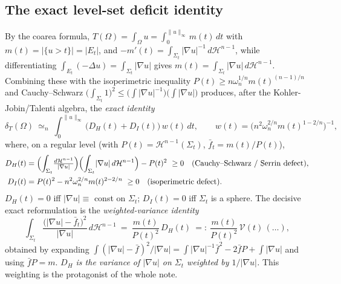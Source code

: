 \documentclass[11pt]{amsart}
\theoremstyle{definition}
\theoremstyle{remark}
\newcommand{\Om}{\Omega}
\newcommand{\dT}{\delta_T}
\newcommand{\Vbar}{\mathcal V}
\newcommand{\Hn}{\mathcal H^{n-1}}
\begin{document}
\subsection{The exact level-set deficit identity}
By the coarea formula, $T(\Om)=\int_\Om u=\int_0^{\|u\|_\infty}m(t)\,dt$
with $m(t)=|\{u>t\}|=|E_t|$, and
$-m'(t)=\int_{\Sigma_t}|\nabla u|^{-1}\,d\Hn$, while differentiating
$\int_{E_t}(-\Delta u)=\int_{\Sigma_t}|\nabla u|$ gives
$m(t)=\int_{\Sigma_t}|\nabla u|\,d\Hn$. Combining these with the
isoperimetric inequality $P(t)\ge n\omega_n^{1/n}m(t)^{(n-1)/n}$ and
Cauchy--Schwarz $\bigl(\int_{\Sigma_t}1\bigr)^2\le
\bigl(\int|\nabla u|^{-1}\bigr)\bigl(\int|\nabla u|\bigr)$ produces, after the
Kohler-Jobin/Talenti algebra, the \emph{exact identity}
\begin{equation}\label{eq:identity}
  \dT(\Om)\ \simeq_n\ \int_0^{\|u\|_\infty}\!\bigl(D_H(t)+D_I(t)\bigr)\,w(t)\,dt,
  \qquad w(t)=\bigl(n^2\omega_n^{2/n}m(t)^{1-2/n}\bigr)^{-1},
\end{equation}
where, on a regular level (with $P(t)=\Hn(\Sigma_t)$, $\bar f_t=m(t)/P(t)$),
\begin{align}
  D_H(t)&=\Bigl(\int_{\Sigma_t}\!\tfrac{d\Hn}{|\nabla u|}\Bigr)
          \Bigl(\int_{\Sigma_t}\!|\nabla u|\,d\Hn\Bigr)-P(t)^2\ \ge0
          \quad(\text{Cauchy--Schwarz / Serrin defect}),
  \label{eq:DH}\\
  D_I(t)&=P(t)^2-n^2\omega_n^{2/n}m(t)^{2-2/n}\ \ge0
          \quad(\text{isoperimetric defect}).
  \label{eq:DI}
\end{align}
$D_H(t)=0$ iff $|\nabla u|\equiv$ const on $\Sigma_t$; $D_I(t)=0$ iff
$\Sigma_t$ is a sphere. The decisive exact reformulation is the
\emph{weighted-variance identity}
\begin{equation}\label{eq:boxed}
  \int_{\Sigma_t}\frac{\bigl(|\nabla u|-\bar f_t\bigr)^2}{|\nabla u|}\,d\Hn
  \ =\ \frac{m(t)}{P(t)^2}\,D_H(t)\ =:\ \frac{m(t)}{P(t)^2}\,\Vbar(t)\,(\dots),
\end{equation}
obtained by expanding $\int(|\nabla u|-\bar f)^2/|\nabla u|=\int|\nabla u|^{-1}\bar f^2-2\bar f P+\int|\nabla u|$ and using $\bar f P=m$.
\emph{$D_H$ is the variance of $|\nabla u|$ on $\Sigma_t$ weighted by
$1/|\nabla u|$.} This weighting is the protagonist of the whole note.
\end{document}
